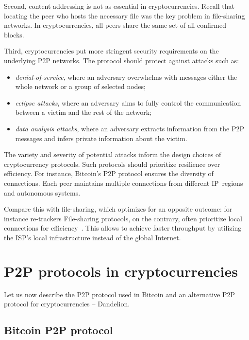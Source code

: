 Second, content addressing is not as essential in cryptocurrencies.
Recall that locating the peer who hosts the necessary file was the key problem in file-sharing networks.
In cryptocurrencies, all peers share the same set of all confirmed blocks.

Third, cryptocurrencies put more stringent security requirements on the underlying P2P networks.
The protocol should protect against attacks such as:%

\begin{itemize}
	\item \textit{denial-of-service}, where an adversary overwhelms with messages either the whole network or a group of selected nodes;
	\item \textit{eclipse attacks}, where an adversary aims to fully control the communication between a victim and the rest of the network;
	\item \textit{data analysis attacks}, where an adversary extracts information from the P2P messages and infers private information about the victim.
\end{itemize}

The variety and severity of potential attacks inform the design choices of cryptocurrency protocols.
Such protocols should prioritize resilience over efficiency.
For instance, Bitcoin's P2P protocol ensures the diversity of connections.
Each peer maintains multiple connections from different IP~regions and autonomous systems.

Compare this with file-sharing, which optimizes for an opposite outcome: for instance re-trackers 
File-sharing protocols, on the contrary, often prioritize local connections for efficiency~\cite{Yoshida2012,Wang2012}.
This allows to achieve faster throughput by utilizing the ISP's local infrastructure instead of the global Internet.


\section{P2P protocols in cryptocurrencies}

Let us now describe the P2P protocol used in Bitcoin and an alternative P2P protocol for cryptocurrencies -- Dandelion.

\subsection{Bitcoin P2P protocol}
\label{sec:BitcoinP2PProtocol}

